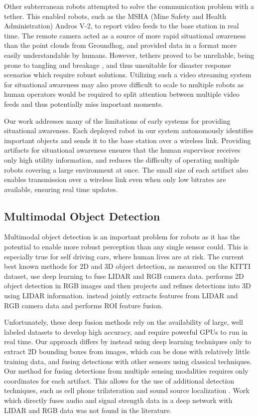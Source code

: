 Other subterranean robots attempted to solve the communication problem with a tether. This enabled robots, such as the MSHA (Mine Safety and Health Administration) Andros V-2, to report video feeds to the base station in real time. The remote camera acted as a source of more rapid situational awareness than the point clouds from Groundhog, and provided data in a format more easily understandable by humans. However, tethers proved to be unreliable, being prone to tangling and breakage \cite{murphy2009mobile}, and thus unsuitable for disaster response scenarios which require robust solutions. Utilizing such a video streaming system for situational awareness may also prove difficult to scale to multiple robots as human operators would be required to split attention between multiple video feeds and thus potentially miss important moments.

Our work addresses many of the limitations of early systems for providing situational awareness. Each deployed robot in our system autonomously identifies important objects and sends it to the base station over a wireless link. Providing artifacts for situational awareness ensures that the human supervisor receives only high utility information, and reduces the difficulty of operating multiple robots covering a large environment at once. The small size of each artifact also enables transmission over a wireless link even when only low bitrates are available, ensuring real time updates.

\subsection{Multimodal Object Detection}

Multimodal object detection is an important problem for robots as it has the potential to enable more robust perception than any single sensor could. This is especially true for self driving cars, where human lives are at risk. The current best known methods for 2D and 3D object detection, as measured on the KITTI dataset, use deep learning to fuse LIDAR and RGB camera data. \cite{qi2018frustum} performs 2D object detection in RGB images and then projects and refines detections into 3D using LIDAR information. \cite{liang2019multi} instead jointly extracts features from LIDAR and RGB camera data and performs ROI feature fusion.

Unfortunately, these deep fusion methods rely on the availability of large, well labeled datasets to develop high accuracy, and require powerful GPUs to run in real time. Our approach differs by instead using deep learning techniques only to extract 2D bounding boxes from images, which can be done with relatively little training data, and fusing detections with other sensors using classical techniques. Our method for fusing detections from multiple sensing modalities requires only coordinates for each artifact. This allows for the use of additional detection techniques, such as cell phone trilateration \cite{iglesias2012indoor} and sound source localization \cite{grondin2019lightweight}. Work which directly fuses audio and signal strength data in a deep network with LIDAR and RGB data was not found in the literature.